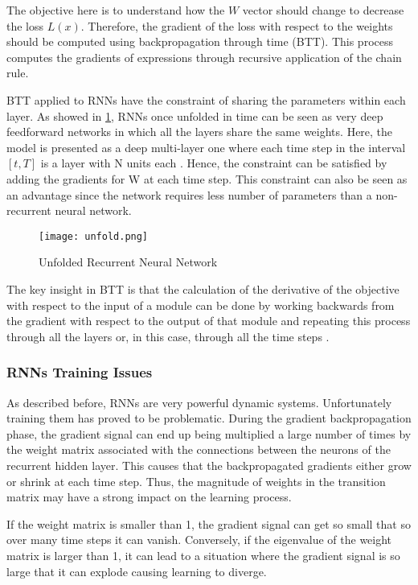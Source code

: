 The objective here is to understand how the $W$ vector should change to decrease the loss $L(x)$. Therefore, the gradient of the loss with respect to the weights should be computed using backpropagation through time (BTT). This process computes the gradients of expressions through recursive application of the chain rule. 

BTT applied to RNNs have the constraint of sharing the parameters within each layer. As showed in  \ref{fig:unfold}, RNNs once unfolded in time can be seen as very deep feedforward networks in which all the layers share the same weights\cite{lecun2015deep}. Here, the model is presented as a deep multi-layer one where each time step in the interval $[t,T]$ is a layer with N units each \cite{pascanu2013difficulty}. Hence, the constraint can be satisfied by adding the gradients for W at each time step. This constraint can also be seen as an advantage since the network requires less number of parameters than a non-recurrent neural network.

\begin{figure}
\label{fig:unfold}
\center
\texttt{[image: unfold.png]}
\caption{Unfolded Recurrent Neural Network}
\end{figure}

The key insight in BTT is that the calculation of the derivative of the objective with respect to the input of a module can be done by working backwards from the gradient with respect to the output of that module and repeating this process through all the layers or, in this case, through all the time steps \cite{schmidhuber2015deep}.

\subsubsection{RNNs Training Issues}
As described before, RNNs are very powerful dynamic systems. Unfortunately training them has proved to be problematic. During the gradient backpropagation phase, the gradient signal can end up being multiplied a large number of times by the weight matrix associated with the connections between the neurons of the recurrent hidden layer. This causes that the backpropagated gradients either grow or shrink at each time step. Thus, the magnitude of weights in the transition matrix may have a strong impact on the learning process.

If the  weight matrix is smaller than 1, the gradient signal can get so small that so over many time steps it can vanish. Conversely, if the eigenvalue of the weight matrix is larger than 1, it can lead to a situation where the gradient signal is so large that it can explode causing learning to diverge. 

